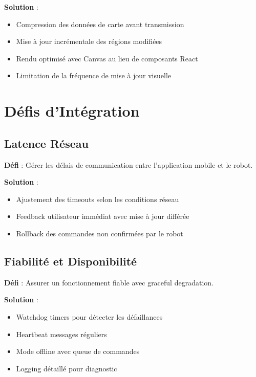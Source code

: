 \documentclass[12pt,a4paper,oneside]{report}
\begin{document}
\textbf{Solution} :
\begin{itemize}
  \item Compression des données de carte avant transmission
  \item Mise à jour incrémentale des régions modifiées
  \item Rendu optimisé avec Canvas au lieu de composants React
  \item Limitation de la fréquence de mise à jour visuelle
\end{itemize}

\section{Défis d'Intégration}

\subsection{Latence Réseau}

\textbf{Défi} : Gérer les délais de communication entre l'application mobile et le robot.

\textbf{Solution} :
\begin{itemize}
  \item Ajustement des timeouts selon les conditions réseau
  \item Feedback utilisateur immédiat avec mise à jour différée
  \item Rollback des commandes non confirmées par le robot
\end{itemize}

\subsection{Fiabilité et Disponibilité}

\textbf{Défi} : Assurer un fonctionnement fiable avec graceful degradation.

\textbf{Solution} :
\begin{itemize}
  \item Watchdog timers pour détecter les défaillances
  \item Heartbeat messages réguliers
  \item Mode offline avec queue de commandes
  \item Logging détaillé pour diagnostic
\end{itemize}

\newpage

\end{document}
